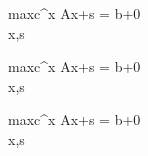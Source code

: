 \documentclass{article}
\begin{document}
%
%
%
%
	\begin{lpalign*}
	{max}{c^\top x}
    Ax+s = b+0 \\
    x,s  
  \end{lpalign*}
	\begin{lpalign*}
	{max}{c^\top x}
    Ax+s = b+0 \\
    x,s  
  \end{lpalign*}
	\begin{lpalign*}
	{max}{c^\top x}
    Ax+s = b+0 \\
    x,s  
  \end{lpalign*}
\end{document}
